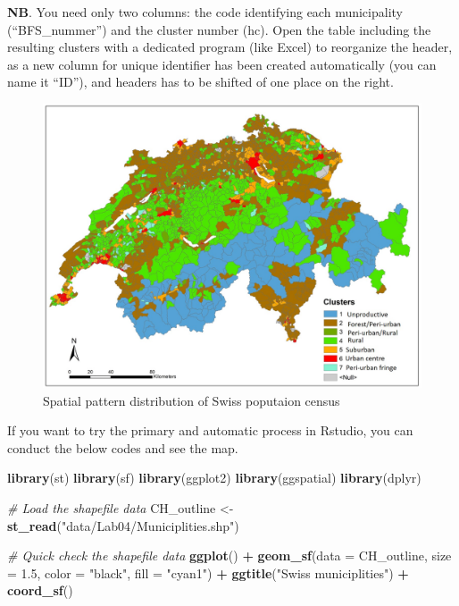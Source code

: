 \documentclass[
]{book}
\newenvironment{Shaded}{\begin{snugshade}}{\end{snugshade}}
\newcommand{\AttributeTok}[1]{\textcolor[rgb]{0.13,0.29,0.53}{#1}}
\newcommand{\CommentTok}[1]{\textcolor[rgb]{0.56,0.35,0.01}{\textit{#1}}}
\newcommand{\FloatTok}[1]{\textcolor[rgb]{0.00,0.00,0.81}{#1}}
\newcommand{\FunctionTok}[1]{\textcolor[rgb]{0.13,0.29,0.53}{\textbf{#1}}}
\newcommand{\NormalTok}[1]{#1}
\newcommand{\OtherTok}[1]{\textcolor[rgb]{0.56,0.35,0.01}{#1}}
\newcommand{\SpecialCharTok}[1]{\textcolor[rgb]{0.81,0.36,0.00}{\textbf{#1}}}
\newcommand{\StringTok}[1]{\textcolor[rgb]{0.31,0.60,0.02}{#1}}
\begin{document}
\textbf{NB}. You need only two columns: the code identifying each municipality (``BFS\_nummer'') and the cluster number (hc).
Open the table including the resulting clusters with a dedicated program (like Excel) to reorganize the header, as a new column for unique identifier has been created automatically (you can name it ``ID''), and headers has to be shifted of one place on the right.

\begin{figure}

{\centering \includegraphics[width=0.7\linewidth,height=0.7\textheight]{images/Clusters_7} 

}

\caption{Spatial pattern distribution of Swiss poputaion census \label{Clusters_7}}\label{fig:jpg2}
\end{figure}

If you want to try the primary and automatic process in Rstudio, you can conduct the below codes and see the map.

\begin{Shaded}
\begin{Highlighting}[]
\FunctionTok{library}\NormalTok{(st)}
\FunctionTok{library}\NormalTok{(sf)}
\FunctionTok{library}\NormalTok{(ggplot2)}
\FunctionTok{library}\NormalTok{(ggspatial)}
\FunctionTok{library}\NormalTok{(dplyr)}
\end{Highlighting}
\end{Shaded}

\begin{Shaded}
\begin{Highlighting}[]
\CommentTok{\# Load the shapefile data}
\NormalTok{CH\_outline }\OtherTok{\textless{}{-}} \FunctionTok{st\_read}\NormalTok{(}\StringTok{"data/Lab04/Municiplities.shp"}\NormalTok{)}

\CommentTok{\# Quick check the shapefile data}
\FunctionTok{ggplot}\NormalTok{() }\SpecialCharTok{+} 
  \FunctionTok{geom\_sf}\NormalTok{(}\AttributeTok{data =}\NormalTok{ CH\_outline, }\AttributeTok{size =} \FloatTok{1.5}\NormalTok{, }\AttributeTok{color =} \StringTok{"black"}\NormalTok{, }\AttributeTok{fill =} \StringTok{"cyan1"}\NormalTok{) }\SpecialCharTok{+} 
  \FunctionTok{ggtitle}\NormalTok{(}\StringTok{"Swiss municiplities"}\NormalTok{) }\SpecialCharTok{+} 
  \FunctionTok{coord\_sf}\NormalTok{()}
\end{Highlighting}
\end{Shaded}
\end{document}
